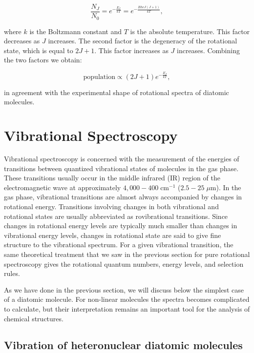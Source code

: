 \documentclass[
  9pt,
]{extbook}
\theoremstyle{definition}
\theoremstyle{definition}
\theoremstyle{definition}
\theoremstyle{remark}
\begin{document}
\begin{equation}
\frac{N_J}{N_0}=e^{-\frac{E_J}{kT}} =e^{-\frac {BhcJ(J+1)}{kT}},
\label{eq:rot6}
\end{equation}

where \(k\) is the Boltzmann constant and \(T\) is the absolute temperature. This factor decreases as \(J\) increases. The second factor is the degeneracy of the rotational state, which is equal to \(2J+1\). This factor increases as \(J\) increases. Combining the two factors we obtain:

\begin{equation}
\mathrm{population} \propto (2J+1)e^{-\frac{E_J}{kT}},
\label{eq:rot7}
\end{equation}

in agreement with the experimental shape of rotational spectra of diatomic molecules.

\hypertarget{vibrational-spectroscopy}{%
\section{Vibrational Spectroscopy}\label{vibrational-spectroscopy}}

Vibrational spectroscopy is concerned with the measurement of the energies of transitions between quantized vibrational states of molecules in the gas phase. These transitions usually occur in the middle infrared (IR) region of the electromagnetic wave at approximately \(4,000-400\;\text{cm}^{-1}\) (\(2.5-25\;\mu \text{m}\)). In the gas phase, vibrational transitions are almost always accompanied by changes in rotational energy. Transitions involving changes in both vibrational and rotational states are usually abbreviated as rovibrational transitions. Since changes in rotational energy levels are typically much smaller than changes in vibrational energy levels, changes in rotational state are said to give fine structure to the vibrational spectrum. For a given vibrational transition, the same theoretical treatment that we saw in the previous section for pure rotational spectroscopy gives the rotational quantum numbers, energy levels, and selection rules.

As we have done in the previous section, we will discuss below the simplest case of a diatomic molecule. For non-linear molecules the spectra becomes complicated to calculate, but their interpretation remains an important tool for the analysis of chemical structures.

\hypertarget{vibration-of-heteronuclear-diatomic-molecules}{%
\subsection{Vibration of heteronuclear diatomic molecules}\label{vibration-of-heteronuclear-diatomic-molecules}}
\end{document}
